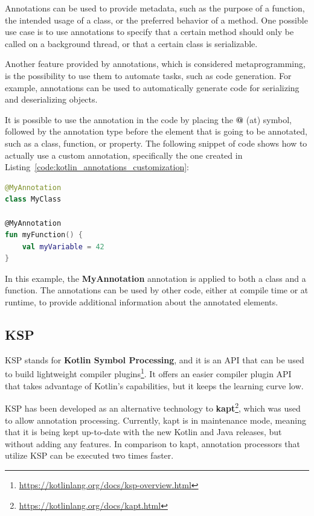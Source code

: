 Annotations can be used to provide metadata, such as the purpose of a function, the intended usage of a class, or the preferred behavior of a method. One possible use case is to use annotations to specify that a certain method should only be called on a background thread, or that a certain class is serializable.

Another feature provided by annotations, which is considered metaprogramming, is the possibility to use them to automate tasks, such as code generation. For example, annotations can be used to automatically generate code for serializing and deserializing objects.

It is possible to use the annotation in the code by placing the \textbf{@} (at) symbol, followed by the annotation type before the element that is going to be annotated, such as a class, function, or property.\newline
The following snippet of code shows how to actually use a custom annotation, specifically the one created in Listing~\ref{code:kotlin_annotations_customization}:
\begin{lstlisting}[caption={Example of usage of a custom annotation in Kotlin}, language=Kotlin, captionpos=b, label={code:kotlin_annotations_usage}]
@MyAnnotation
class MyClass

@MyAnnotation
fun myFunction() {
    val myVariable = 42
}
\end{lstlisting}
In this example, the \textbf{MyAnnotation} annotation is applied to both a class and a function. The annotations can be used by other code, either at compile time or at runtime, to provide additional information about the annotated elements.

\subsection{KSP}\label{section:ksp}
KSP stands for \textbf{Kotlin Symbol Processing}, and it is an API that can be used to build lightweight compiler plugins\footnote{\url{https://kotlinlang.org/docs/ksp-overview.html}\label{ksp_footnote}}. It offers an easier compiler plugin API that takes advantage of Kotlin's capabilities, but it keeps the learning curve low.

KSP has been developed as an alternative technology to \textbf{kapt}\footnote{\url{https://kotlinlang.org/docs/kapt.html}}, which was used to allow annotation processing. Currently, kapt is in maintenance mode, meaning that it is being kept up-to-date with the new Kotlin and Java releases, but without adding any features.\newline
In comparison to kapt, annotation processors that utilize KSP can be executed two times faster.

